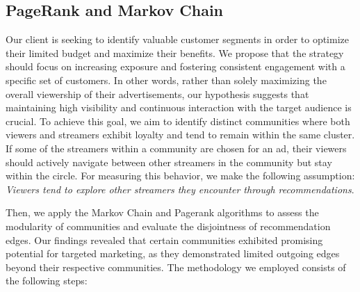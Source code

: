 \documentclass[11pt, oneside]{article}   	%
\begin{document}
\subsection{PageRank and Markov Chain}
Our client is seeking to identify valuable customer segments in order to optimize their limited budget and maximize their benefits. We propose that the strategy should focus on increasing exposure and fostering consistent engagement with a specific set of customers. In other words, rather than solely maximizing the overall viewership of their advertisements, our hypothesis suggests that maintaining high visibility and continuous interaction with the target audience is crucial. To achieve this goal, we aim to identify distinct communities where both viewers and streamers exhibit loyalty and tend to remain within the same cluster. If some of the streamers within a community are chosen for an ad, their viewers should actively navigate between other streamers in the community but stay within the circle. For measuring this behavior, we make the following assumption: \textit{Viewers tend to explore other streamers they encounter through recommendations}.

Then, we apply the Markov Chain and Pagerank algorithms to assess the modularity of communities and evaluate the disjointness of recommendation edges. Our findings revealed that certain communities exhibited promising potential for targeted marketing, as they demonstrated limited outgoing edges beyond their respective communities. The methodology we employed consists of the following steps:
\end{document}
